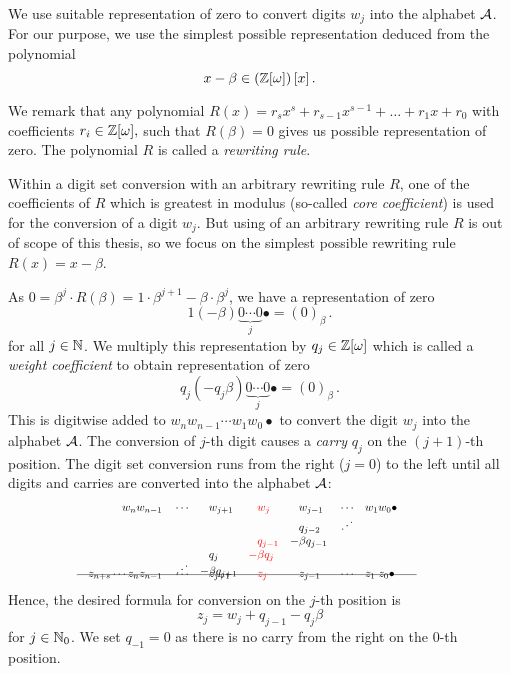   We use suitable representation of zero to convert digits $w_j$ into the alphabet $\mathcal{A}$. 
  For our purpose, we use the simplest possible representation deduced from the polynomial
  $$
    x-\beta \in \left(\mathbb{Z}[\omega]\right)[x]\,.
  $$

We remark that any polynomial $R(x)=r_s x^s+r_{s-1}x^{s-1}+ \dots + r_1 x+r_0$ with coefficients $r_i \in \mathbb{Z}[\omega],$ such that $R(\beta)=0$ gives us possible representation of zero. The polynomial $R$ is called a \emph{rewriting rule}. 

Within a digit set conversion with an arbitrary rewriting rule $R$, one of the coefficients of $R$ which is greatest in modulus (so-called \emph{core coefficient}) is used for the conversion of a digit $w_j$. But using of an arbitrary rewriting rule $R$ is out of scope of this thesis, so we focus on the simplest possible rewriting rule $R(x)=x-\beta$.
  
As $0=\beta^{j} \cdot R(\beta)=1\cdot \beta^{j+1} -\beta \cdot \beta^{j}$, we have a representation of zero 
$$1 (-\!\beta) \underbrace{0 \cdots 0}_{j}\bullet = (0)_\beta\,. $$
for all $j \in \mathbb{N}$. We multiply this representation by $q_j \in \mathbb{Z}[\omega]$ which is called a \emph{weight coefficient} to obtain representation of zero 
$$q_j (-q_j\beta) \underbrace{0 \cdots 0}_{j}\bullet = (0)_\beta\,. $$ 
This is digitwise added to $w_{n} w_{n-1}\cdots w_1 w_0 \bullet$ to convert the digit $w_j$ into the alphabet $\mathcal{A}$. The conversion of $j$-th digit causes a \emph{carry} $q_{j}$ on the $(j+1)$-th position. The digit set conversion runs from the right ($j=0$) to the left until all digits and carries are converted into the alphabet $\mathcal{A}$:
        \begin{align}
        \label{eq:conversionScheme}
            \hspace{100pt}  w_n w_{n-1}&&&\cdots& &w_{j+1}&\!\! &\textcolor{red}{w_j}  & \!\!  &w_{j-1} &&\cdots &&w_1 w_0\bullet \hspace{100pt} \notag\\[-5pt]
                         &&&&       &       & &     &   &q_{j-2} &&\iddots  \notag \\[-3pt] 
                         &&&&       &       & &\textcolor{red}{q_{j-1}}& -&\beta q_{j-1} \notag \\[-3pt]
                         &&&&         &q_j&   \textcolor{red}{-}&\textcolor{red}{\beta q_j} &&\\[-8pt]
                         &&&  \iddots      &   -&\beta q_{j+1}&   &\ && \notag \\[-17pt]
          \intertext{\hspace{60pt}\line(1,0){300}}
          \notag \\[-30pt]
           z_{n+s} \cdots z_{n} z_{n-1}&&&\cdots& &z_{j+1}& &\textcolor{red}{z_j}& &z_{j-1} &&\cdots &&z_1 \; z_0\bullet \notag                  
        \end{align}
    Hence, the desired formula for conversion on the $j$-th position is 
    \begin{equation*}
        z_j=w_j + q_{j-1} - q_j \beta
    \end{equation*}
    for $j \in \mathbb{N}_0$. We set $q_{-1}=0$ as there is no carry from the right on the 0-th position.
    
